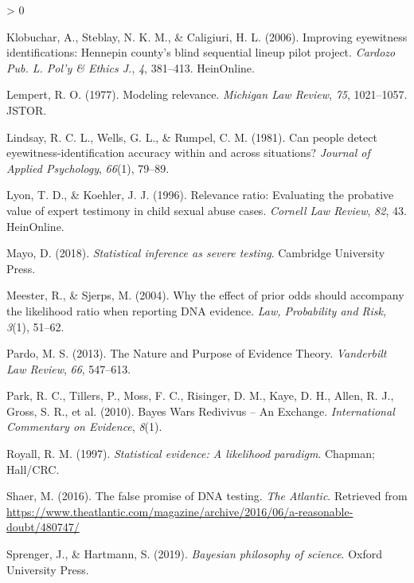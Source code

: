 \documentclass[
  10pt,
  dvipsnames,enabledeprecatedfontcommands]{scrartcl}
\newlength{\cslhangindent}
\newenvironment{CSLReferences}[2] %
 {%
  \setlength{\parindent}{0pt}
  \ifodd #1 \everypar{\setlength{\hangindent}{\cslhangindent}}\ignorespaces\fi
  \ifnum #2 > 0
  \setlength{\parskip}{#2\baselineskip}
  \fi
 }%
 {}
\begin{document}
\begin{CSLReferences}{1}{0}
\leavevmode\hypertarget{ref-klobuchar2006improving}{}%
Klobuchar, A., Steblay, N. K. M., \& Caligiuri, H. L. (2006). Improving
eyewitness identifications: Hennepin county's blind sequential lineup
pilot project. \emph{Cardozo Pub. L. Pol'y \& Ethics J.}, \emph{4},
381--413. HeinOnline.

\leavevmode\hypertarget{ref-lempert1977modeling}{}%
Lempert, R. O. (1977). Modeling relevance. \emph{Michigan Law Review},
\emph{75}, 1021--1057. JSTOR.

\leavevmode\hypertarget{ref-Lindsay1981CanPeopleDetect}{}%
Lindsay, R. C. L., Wells, G. L., \& Rumpel, C. M. (1981). Can people
detect eyewitness-identification accuracy within and across situations?
\emph{Journal of Applied Psychology}, \emph{66}(1), 79--89.

\leavevmode\hypertarget{ref-lyon1996relevance}{}%
Lyon, T. D., \& Koehler, J. J. (1996). Relevance ratio: Evaluating the
probative value of expert testimony in child sexual abuse cases.
\emph{Cornell Law Review}, \emph{82}, 43. HeinOnline.

\leavevmode\hypertarget{ref-mayo2018}{}%
Mayo, D. (2018). \emph{Statistical inference as severe testing}.
Cambridge University Press.

\leavevmode\hypertarget{ref-meester2004WhyEffectPriora}{}%
Meester, R., \& Sjerps, M. (2004). Why the effect of prior odds should
accompany the likelihood ratio when reporting {DNA} evidence. \emph{Law,
Probability and Risk}, \emph{3}(1), 51--62.

\leavevmode\hypertarget{ref-pardo2013NaturePurposeEvidence}{}%
Pardo, M. S. (2013). The {Nature} and {Purpose} of {Evidence Theory}.
\emph{Vanderbilt Law Review}, \emph{66}, 547--613.

\leavevmode\hypertarget{ref-park2010BayesWarsRedivivus}{}%
Park, R. C., Tillers, P., Moss, F. C., Risinger, D. M., Kaye, D. H.,
Allen, R. J., Gross, S. R., et al. (2010). Bayes {Wars Redivivus} -- {An
Exchange}. \emph{International Commentary on Evidence}, \emph{8}(1).

\leavevmode\hypertarget{ref-Royall1997}{}%
Royall, R. M. (1997). \emph{Statistical evidence: A likelihood
paradigm}. Chapman; Hall/CRC.

\leavevmode\hypertarget{ref-Shaer2016False}{}%
Shaer, M. (2016). The false promise of DNA testing. \emph{The Atlantic}.
Retrieved from
\url{https://www.theatlantic.com/magazine/archive/2016/06/a-reasonable-doubt/480747/}

\leavevmode\hypertarget{ref-sprenger2019bayesian}{}%
Sprenger, J., \& Hartmann, S. (2019). \emph{Bayesian philosophy of
science}. Oxford University Press.


\end{CSLReferences}
\end{document}
